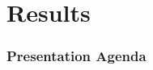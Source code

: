 \section{Results}
\begin{frame}
\frametitle{Presentation Agenda}
\tableofcontents[currentsection]
\end{frame}
